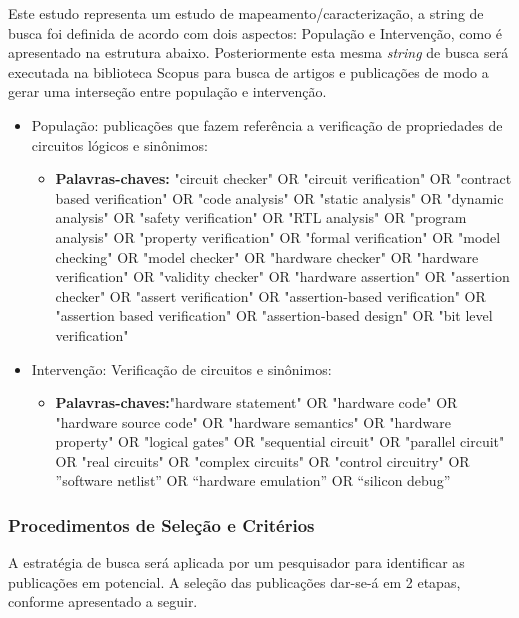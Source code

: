 Este estudo representa um estudo de mapeamento/caracterização, a string de busca foi definida de acordo com dois aspectos: População e Intervenção, como é apresentado na estrutura abaixo. Posteriormente esta mesma \textit{string} de busca será executada na biblioteca Scopus para busca de artigos e publicações de modo a gerar uma interseção entre população e intervenção.
\begin{itemize}
\item População: publicações que fazem referência a verificação de propriedades de circuitos lógicos e sinônimos:
	\begin{itemize}
	\item \textbf{Palavras-chaves:} "circuit checker" OR "circuit verification" OR "contract based verification" OR "code analysis" OR "static analysis" OR "dynamic analysis" OR "safety verification" OR "RTL analysis" OR "program analysis" OR "property verification" OR "formal verification" OR "model checking" OR "model checker" OR "hardware checker" OR "hardware verification" OR "validity checker" OR "hardware assertion" OR "assertion checker" OR "assert verification" OR "assertion-based verification" OR "assertion based verification" OR "assertion-based design" OR "bit level verification"
	\end{itemize}
\item Intervenção: Verificação de circuitos e sinônimos:
	\begin{itemize}
	\item \textbf{Palavras-chaves:}"hardware statement" OR "hardware code" OR "hardware source code" OR "hardware semantics" OR "hardware property" OR "logical gates" OR "sequential circuit" OR "parallel circuit" OR "real circuits" OR "complex circuits" OR "control circuitry" OR ”software netlist” OR “hardware emulation” OR “silicon debug”
	\end{itemize}
\end{itemize}

\subsubsection{Procedimentos de Seleção e Critérios}

\par
A estratégia de busca será aplicada por um pesquisador para identificar as publicações em potencial. A seleção das publicações dar-se-á em 2 etapas, conforme apresentado a seguir.

